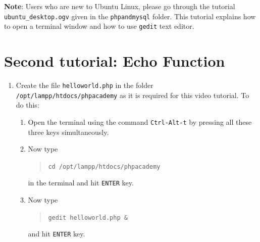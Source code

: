 \documentclass[11pt]{article}
\newenvironment{enumcpt}{\begin{enumerate} \topsep 0pt \partopsep 0pt 
    \parsep 0pt
    \itemsep 0pt \leftmargin -1in \rightmargin 0pt
}{\end{enumerate}}
\begin{document}
\begin{multicols}{2}
\begin{enumcpt}
    \textbf{Note}: Users who are new to Ubuntu Linux, please go through
    the tutorial {\tt ubuntu\_desktop.ogv} given in the {\tt phpandmysql} folder. This
    tutorial explains how to open a terminal window and how to use {\tt gedit}
    text editor.
  \end{enumcpt}

  \section{Second tutorial: Echo Function}
  \begin{enumcpt}
  \item Create the file {\tt helloworld.php} in the folder {\tt
    /opt/lampp/htdocs/phpacademy} as it is required for this video
    tutorial. To do this:
    \begin{enumcpt}
    \item Open the terminal using the command {\tt Ctrl-Alt-t} by
      pressing all these three keys simultaneously.
    \item Now type
      \begin{quote}
        {\tt cd /opt/lampp/htdocs/phpacademy}
      \end{quote}
      in the terminal and hit {\tt ENTER} key.
    \item  Now type 
      \begin{quote}
        {\tt gedit helloworld.php \&}
      \end{quote}
      and hit {\tt ENTER} key.
    \end{enumcpt}


\end{enumcpt}
\end{multicols}
\end{document}
